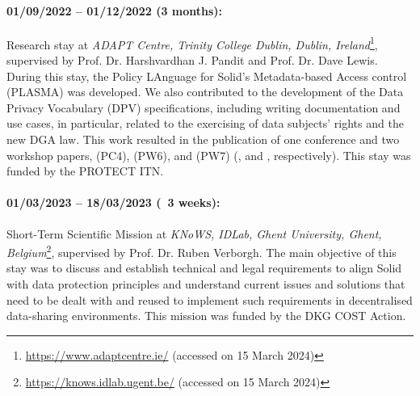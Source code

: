 \paragraph{01/09/2022 -- 01/12/2022 (3 months):} Research stay at \textit{ADAPT Centre, Trinity College Dublin, Dublin, Ireland}\footnote{\url{https://www.adaptcentre.ie/} (accessed on 15 March 2024)}, supervised by Prof. Dr. Harshvardhan J. Pandit and Prof. Dr. Dave Lewis. During this stay, the Policy LAnguage for Solid’s Metadata-based Access control (PLASMA) was developed. We also contributed to the development of the Data Privacy Vocabulary (DPV) specifications, including writing documentation and use cases, in particular, related to the exercising of data subjects' rights and the new DGA law. This work resulted in the publication of one conference and two workshop papers, (PC4), (PW6), and (PW7) (\cite{esteves_semantics_2023}, \cite{esteves_towards_2023} and \cite{esteves_using_2023}, respectively). This stay was funded by the PROTECT ITN.

\paragraph{01/03/2023 -- 18/03/2023 (~3 weeks):} Short-Term Scientific Mission at \textit{KNoWS, IDLab, Ghent University, Ghent, Belgium}\footnote{\url{https://knows.idlab.ugent.be/} (accessed on 15 March 2024)}, supervised by Prof. Dr. Ruben Verborgh. The main objective of this stay was to discuss and establish technical and legal requirements to align Solid with data protection principles and understand current issues and solutions that need to be dealt with and reused to implement such requirements in decentralised data-sharing environments. This mission was funded by the DKG COST Action.